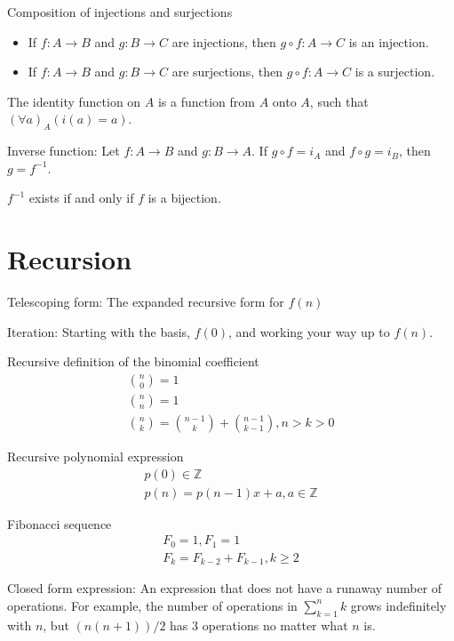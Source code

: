 \documentclass{article}
\begin{document}
Composition of injections and surjections
\begin{itemize}
    \item If $f: A \rightarrow B$ and $g: B \rightarrow C$ are injections, then $g \circ f: A \rightarrow C$ is an injection.
    \item If $f: A \rightarrow B$ and $g: B \rightarrow C$ are surjections, then $g \circ f: A \rightarrow C$ is a surjection.
\end{itemize}

The identity function on $A$ is a function from $A$ onto $A$, such that \\
$(\forall a)_A(i(a) = a)$.

Inverse function: Let $f: A \rightarrow B$ and $g: B \rightarrow A$. If $g \circ f = i_A$ and $f \circ g = i_B$, then $g = f^{-1}$.

$f^{-1}$ exists if and only if $f$ is a bijection.

\section{Recursion}

Telescoping form: The expanded recursive form for $f(n)$

Iteration: Starting with the basis, $f(0)$, and working your way up to $f(n)$.

Recursive definition of the binomial coefficient
\begin{gather*}
    \binom{n}{0} = 1 \\
    \binom{n}{n} = 1 \\
    \binom{n}{k} = \binom{n-1}{k} + \binom{n-1}{k-1}, n > k > 0
\end{gather*}

Recursive polynomial expression
\begin{gather*}
    p(0) \in \mathbb{Z} \\
    p(n) = p(n-1)x + a, a \in \mathbb{Z}
\end{gather*}

Fibonacci sequence
\begin{gather*}
    F_0 = 1, F_1 = 1 \\
    F_k = F_{k-2} + F_{k-1}, k \geq 2
\end{gather*}

Closed form expression: An expression that does not have a runaway number of operations. For example, the number of operations in $\sum_{k=1}^{n} k$ grows indefinitely with $n$, but $(n(n+1)) / 2$ has 3 operations no matter what $n$ is.
\end{document}
